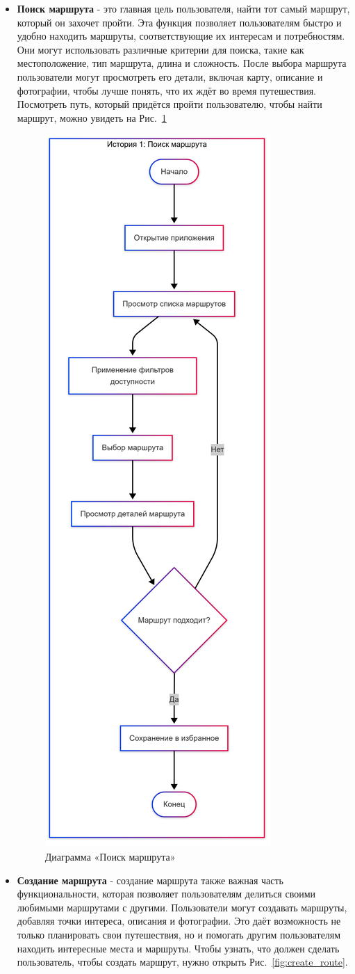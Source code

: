 \begin{itemize}
    \item \textbf{Поиск маршрута} - это главная цель  пользователя, найти тот самый маршрут, который он захочет пройти. Эта функция позволяет пользователям быстро и удобно находить маршруты, соответствующие их интересам и потребностям. Они могут использовать различные критерии для поиска, такие как местоположение, тип маршрута, длина и сложность. После выбора маршрута пользователи могут просмотреть его детали, включая карту, описание и фотографии, чтобы лучше понять, что их ждёт во время путешествия. Посмотреть путь, который придётся пройти пользователю, чтобы найти маршрут, можно увидеть на Рис.~\ref{fig:search_route}
    \begin{figure}[H]
        \centering
        \includegraphics[width=0.4\linewidth]{Images/mobile_logic/история_поиск_маршрута-2025-04-13-175239.png}
        \caption{Диаграмма «Поиск маршрута»}
        \label{fig:search_route}
    \end{figure}
    \item \textbf{Создание маршрута} - создание маршрута также важная часть функциональности, которая позволяет пользователям делиться своими любимыми маршрутами с другими. Пользователи могут создавать маршруты, добавляя точки интереса, описания и фотографии. Это даёт возможность не только планировать свои путешествия, но и помогать другим пользователям находить интересные места и маршруты. Чтобы узнать, что должен сделать пользователь, чтобы создать маршрут, нужно открыть Рис.~\ref{fig:create_route}.

\end{itemize}
